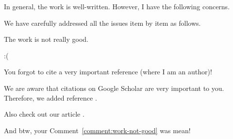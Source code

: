 \documentclass[12pt,USenglish]{scrartcl}
\begin{document}
\reviewer
\begin{generalcomment}
	In general, the work is well-written. However, I have the following concerns.
\end{generalcomment}
\begin{revresponse}
	We have carefully addressed all the issues item by item as follows.
\end{revresponse}

\begin{revcomment}\label{comment:work-not-good}
	The work is not really good.
\end{revcomment}
\begin{revresponse}
	:(
\end{revresponse}

\begin{revcomment}
	You forgot to cite a very important reference (where I am an author)!
\end{revcomment}
\begin{revresponse}
	We are aware that citations on Google Scholar are very important to you.
	Therefore, we added reference \cite{ReviewerReference}.
	
	Also check out our article \cite{Besser2020}.
	
	
	And btw, your Comment~\ref{comment:work-not-good} was mean!
\end{revresponse}
\end{document}
